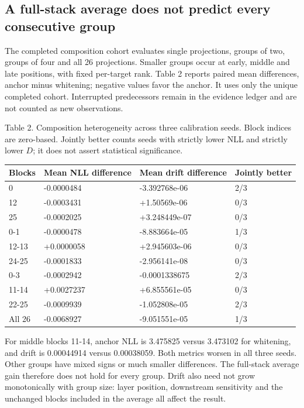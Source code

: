 \documentclass[conference]{IEEEtran}
\begin{document}
\subsection{A full-stack average does not predict every consecutive group}
The completed composition cohort evaluates single projections, groups of two, groups of four and all 26 projections. Smaller groups occur at early, middle and late positions, with fixed per-target rank. Table 2 reports paired mean differences, anchor minus whitening; negative values favor the anchor. It uses only the unique completed cohort. Interrupted predecessors remain in the evidence ledger and are not counted as new observations.\par\smallskip
Table 2. Composition heterogeneity across three calibration seeds. Block indices are zero-based. Jointly better counts seeds with strictly lower NLL and strictly lower $D$; it does not assert statistical significance.\par\smallskip
{\scriptsize\setlength{\tabcolsep}{2pt}
\noindent\begin{tabular}{@{}p{}p{}p{}p{}@{}}\toprule
Blocks & Mean NLL difference & Mean drift difference & Jointly better \\
\midrule
0 & -0.0000484 & -3.392768e-06 & 2/3 \\
12 & -0.0003431 & +1.50569e-06 & 0/3 \\
25 & -0.0002025 & +3.248449e-07 & 0/3 \\
0-1 & -0.0000478 & -8.883664e-05 & 1/3 \\
12-13 & +0.0000058 & +2.945603e-06 & 0/3 \\
24-25 & -0.0001833 & -2.956141e-08 & 0/3 \\
0-3 & -0.0002942 & -0.0001338675 & 2/3 \\
11-14 & +0.0027237 & +6.855561e-05 & 0/3 \\
22-25 & -0.0009939 & -1.052808e-05 & 2/3 \\
All 26 & -0.0068927 & -9.051551e-05 & 1/3 \\
\bottomrule\end{tabular}}\par\medskip
For middle blocks 11-14, anchor NLL is 3.475825 versus 3.473102 for whitening, and drift is 0.00044914 versus 0.00038059. Both metrics worsen in all three seeds. Other groups have mixed signs or much smaller differences. The full-stack average gain therefore does not hold for every group. Drift also need not grow monotonically with group size: layer position, downstream sensitivity and the unchanged blocks included in the average all affect the result.\par\smallskip
\end{document}
